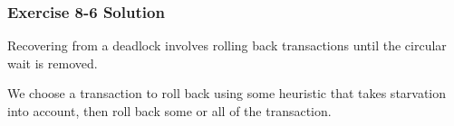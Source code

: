 \begin{frame}
\frametitle{Exercise 8-6 Solution}

Recovering from a deadlock involves rolling back transactions until the circular wait is removed.

We choose a transaction to roll back using some heuristic that takes starvation into account, then roll back some or all of the transaction.

\end{frame}



